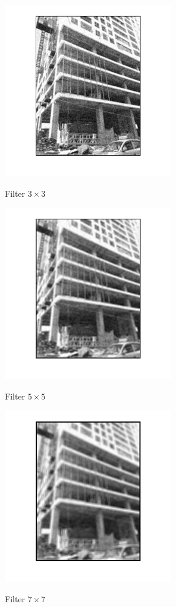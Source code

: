 \begin{center}
	\includegraphics{avec3.png}
	
	Filter $3\times3$
	
	 \includegraphics{avec5.png}
	
	Filter $5\times5$
	
		\includegraphics{avec7.png}
	
Filter $7\times7$
\end{center}

